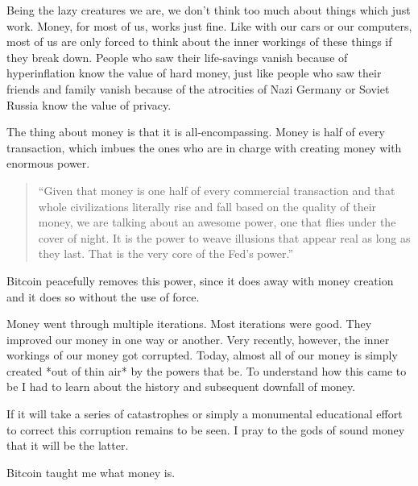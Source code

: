 Being the lazy creatures we are, we don't think too much about things
which just work. Money, for most of us, works just fine. Like with our
cars or our computers, most of us are only forced to think about the
inner workings of these things if they break down. People who saw their
life-savings vanish because of hyperinflation know the value of hard
money, just like people who saw their friends and family vanish because
of the atrocities of Nazi Germany or Soviet Russia know the value of
privacy.

The thing about money is that it is all-encompassing. Money is half of
every transaction, which imbues the ones who are in charge with creating
money with enormous power.

\begin{quotation}
``Given that money is one half of every commercial transaction and that
whole civilizations literally rise and fall based on the quality of
their money, we are talking about an awesome power, one that flies
under the cover of night. It is the power to weave illusions that
appear real as long as they last. That is the very core of the
Fed's power.''
\end{quotation}

Bitcoin peacefully removes this power, since it does away with money
creation and it does so without the use of force.

Money went through multiple iterations. Most iterations were good. They
improved our money in one way or another. Very recently, however, the
inner workings of our money got corrupted. Today, almost all of our
money is simply created *out of thin air* by the powers that be. To
understand how this came to be I had to learn about the history and
subsequent downfall of money.

If it will take a series of catastrophes or simply a monumental
educational effort to correct this corruption remains to be seen. I pray
to the gods of sound money that it will be the latter.

Bitcoin taught me what money is.

%
%
%
%
